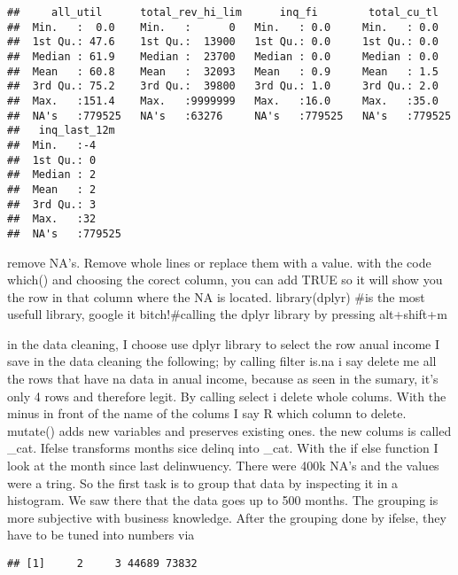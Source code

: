 \documentclass[
]{article}
\newenvironment{Shaded}{\begin{snugshade}}{\end{snugshade}}
\newcommand{\ConstantTok}[1]{\textcolor[rgb]{0.00,0.00,0.00}{#1}}
\newcommand{\FunctionTok}[1]{\textcolor[rgb]{0.00,0.00,0.00}{#1}}
\newcommand{\NormalTok}[1]{#1}
\newcommand{\SpecialCharTok}[1]{\textcolor[rgb]{0.00,0.00,0.00}{#1}}
\begin{document}
\begin{verbatim}
##     all_util      total_rev_hi_lim      inq_fi        total_cu_tl    
##  Min.   :  0.0    Min.   :      0   Min.   : 0.0     Min.   : 0.0    
##  1st Qu.: 47.6    1st Qu.:  13900   1st Qu.: 0.0     1st Qu.: 0.0    
##  Median : 61.9    Median :  23700   Median : 0.0     Median : 0.0    
##  Mean   : 60.8    Mean   :  32093   Mean   : 0.9     Mean   : 1.5    
##  3rd Qu.: 75.2    3rd Qu.:  39800   3rd Qu.: 1.0     3rd Qu.: 2.0    
##  Max.   :151.4    Max.   :9999999   Max.   :16.0     Max.   :35.0    
##  NA's   :779525   NA's   :63276     NA's   :779525   NA's   :779525  
##   inq_last_12m   
##  Min.   :-4      
##  1st Qu.: 0      
##  Median : 2      
##  Mean   : 2      
##  3rd Qu.: 3      
##  Max.   :32      
##  NA's   :779525
\end{verbatim}

remove NA's. Remove whole lines or replace them with a value. with the
code which() and choosing the corect column, you can add TRUE so it will
show you the row in that column where the NA is located. library(dplyr)
\#is the most usefull library, google it bitch!\#calling the dplyr
library by pressing alt+shift+m

in the data cleaning, I choose use dplyr library to select the row anual
income I save in the data cleaning the following; by calling filter
is.na i say delete me all the rows that have na data in anual income,
because as seen in the sumary, it's only 4 rows and therefore legit. By
calling select i delete whole colums. With the minus in front of the
name of the colums I say R which column to delete. mutate() adds new
variables and preserves existing ones. the new colums is called \_cat.
Ifelse transforms months sice delinq into \_cat. With the if else
function I look at the month since last delinwuency. There were 400k
NA's and the values were a tring. So the first task is to group that
data by inspecting it in a histogram. We saw there that the data goes up
to 500 months. The grouping is more subjective with business knowledge.
After the grouping done by ifelse, they have to be tuned into numbers
via

\begin{Shaded}
\end{Shaded}

\begin{verbatim}
## [1]     2     3 44689 73832
\end{verbatim}
\end{document}
